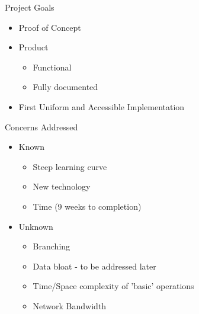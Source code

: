 \documentclass[dvips,11pt]{beamer}
\begin{document}
\begin{frame}{Project Goals}
    
  \begin{itemize}
  \item Proof of Concept
  \item Product 
    \begin{itemize}    
    \item Functional
    \item Fully documented
  \end{itemize}
  \item First Uniform and Accessible Implementation 
  \end{itemize}
  
\end{frame}

\begin{frame}{Concerns Addressed}
  
  \begin{itemize}
  \item Known
    
    \begin{itemize}
    \item Steep learning curve
    \item New technology
    \item Time (9 weeks to completion)
    \end{itemize}
    
  \item Unknown
    
    \begin{itemize}
    \item Branching
    \item Data bloat - to be addressed later
    \item Time/Space complexity of 'basic' operations
    \item Network Bandwidth
    \end{itemize}
  
  \end{itemize}

\end{frame}
\end{document}
